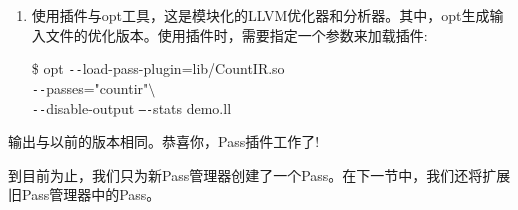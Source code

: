 \begin{enumerate}
\item 使用插件与opt工具，这是模块化的LLVM优化器和分析器。其中，opt生成输入文件的优化版本。使用插件时，需要指定一个参数来加载插件:
\begin{tcolorbox}[colback=white,colframe=black]
\$ opt \verb|--|load-pass-plugin=lib/CountIR.so \\
\verb|--|passes="countir"$\setminus$ \\
\hspace*{0.5cm}\verb|--|disable-output \verb|–-|stats demo.ll
\end{tcolorbox}
	
\end{enumerate}

输出与以前的版本相同。恭喜你，Pass插件工作了!\par

到目前为止，我们只为新Pass管理器创建了一个Pass。在下一节中，我们还将扩展旧Pass管理器中的Pass。\par




















